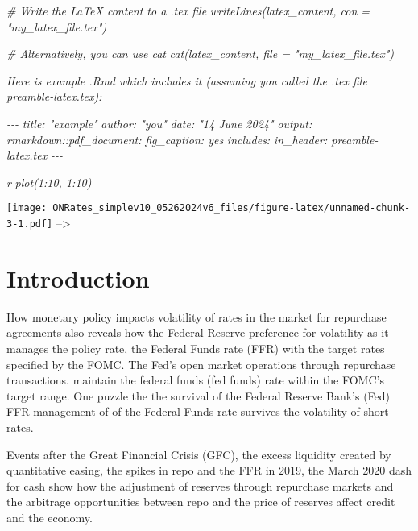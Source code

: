 \documentclass[
]{article}
\newenvironment{Shaded}{\begin{snugshade}}{\end{snugshade}}
\newcommand{\CommentTok}[1]{\textcolor[rgb]{0.56,0.35,0.01}{\textit{#1}}}
\begin{document}
\begin{Shaded}
\begin{Highlighting}[]
\CommentTok{\# Write the LaTeX content to a .tex file}
\CommentTok{writeLines(latex\_content, con = "my\_latex\_file.tex")}

\CommentTok{\# Alternatively, you can use cat}
\CommentTok{cat(latex\_content, file = "my\_latex\_file.tex")}



\CommentTok{Here is example .Rmd which includes it (assuming you called the .tex file \textquotesingle{}preamble{-}latex.tex\textquotesingle{}):}

\CommentTok{{-}{-}{-}}
\CommentTok{title: "example"}
\CommentTok{author: "you"}
\CommentTok{date: "14 June 2024"}
\CommentTok{output:}
\CommentTok{  rmarkdown::pdf\_document:}
\CommentTok{    fig\_caption: yes        }
\CommentTok{    includes:  }
\CommentTok{      in\_header: preamble{-}latex.tex}
\CommentTok{{-}{-}{-}}


\CommentTok{\textasciigrave{}\textasciigrave{}\textasciigrave{}r}
\CommentTok{plot(1:10, 1:10)}
\end{Highlighting}
\end{Shaded}

\texttt{[image: ONRates\_simplev10\_05262024v6\_files/figure-latex/unnamed-chunk-3-1.pdf]}
--\textgreater{}

\hypertarget{introduction}{%
\section{Introduction}\label{introduction}}

How monetary policy impacts volatility of rates in the market for repurchase agreements also reveals how the Federal Reserve preference for volatility as it manages the policy rate, the Federal Funds rate (FFR) with the target rates specified by the FOMC. The Fed's open market operations through repurchase transactions. maintain the federal funds (fed funds) rate within the FOMC's target range. One puzzle the the survival of the Federal Reserve Bank's (Fed) FFR management of of the Federal Funds rate survives the volatility of short rates.

Events after the Great Financial Crisis (GFC), the excess liquidity created by quantitative easing, the spikes in repo and the FFR in 2019, the March 2020 dash for cash show how the adjustment of reserves through repurchase markets and the arbitrage opportunities between repo and the price of reserves affect credit and the economy.
\end{document}
